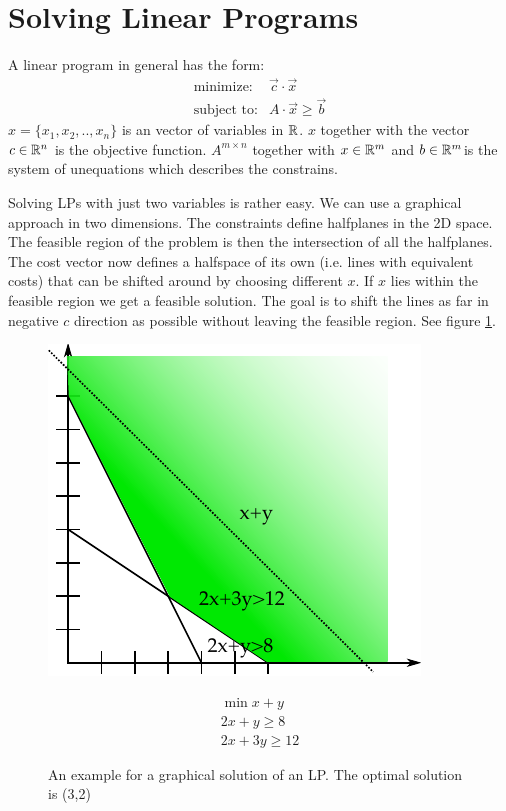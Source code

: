 \section{Solving Linear Programs}
A linear program in general has the form:
\begin{eqnarray*}
\text{minimize:}& \vec c \cdot \vec x \\
\text{subject to:} & A \cdot \vec x \geq \vec b
\end{eqnarray*}
$x=\{x_1,x_2,..,x_n\}$ is an vector of variables in $\mathbb{R}$. $x$ together with the vector $c \in \mathbb{R}^n$ is the objective function.
$A^{m \times n}$ together with $x\in \mathbb{R}^m$ and $b \in \mathbb{R}^m$is the system of unequations which describes the constrains.

Solving LPs with just two variables is rather easy. We can use a graphical approach in two dimensions. The constraints define halfplanes in the 2D space. The feasible region of the problem is then the intersection of all the halfplanes. The cost vector now defines a halfspace of its own (i.e. lines with equivalent costs) that can be shifted around by choosing different $x$. If $x$ lies within the feasible region we get a feasible solution. The goal is to shift the lines as far in negative $c$ direction as possible without leaving the feasible region. See figure \ref{Fig:graphSolutionEx}.

\begin{figure}[hbt]
\begin{minipage}[hbt]{0.4\linewidth}
\includegraphics{./images/graphSolutionEx.pdf}
\end{minipage}
\hfill
\begin{minipage}[hbt]{0.4\linewidth}
\begin{align*}
\min x+y\\
2x+y\geq 8\\
2x+3y\geq 12
\end{align*}
\end{minipage}
\caption{An example for a graphical solution of an LP. The optimal solution is (3,2)}
\label{Fig:graphSolutionEx}
\end{figure}

